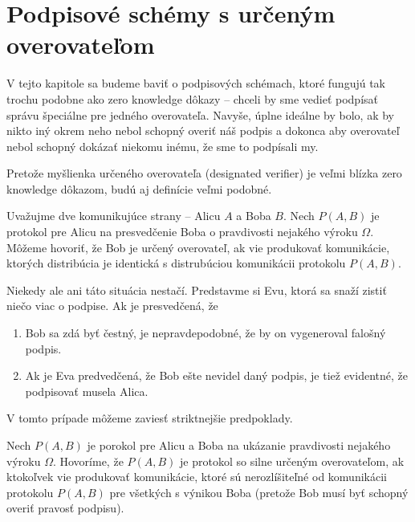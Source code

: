 \section{Podpisové schémy s určeným overovateľom}

V tejto kapitole sa budeme baviť o podpisových schémach, ktoré fungujú
tak trochu podobne ako zero knowledge dôkazy -- chceli by sme vedieť
podpísať správu špeciálne pre jedného overovateľa. Navyše, úplne
ideálne by bolo, ak by nikto iný okrem neho nebol schopný overiť náš
podpis a dokonca aby overovateľ nebol schopný dokázať niekomu inému,
že sme to podpísali my.

Pretože myšlienka určeného overovateľa (designated verifier) je veľmi
blízka zero knowledge dôkazom, budú aj definície veľmi podobné.

\begin{definicia}
    Uvažujme dve komunikujúce strany -- Alicu $A$ a Boba $B$. Nech
    $P(A,B)$ je protokol pre Alicu na presvedčenie
    Boba o pravdivosti nejakého výroku $\Omega$. Môžeme hovoriť, že
    Bob je určený overovateľ, ak vie produkovať komunikácie, ktorých
    distribúcia je identická s distrubúciou komunikácii protokolu
    $P(A,B)$.
\end{definicia}

Niekedy ale ani táto situácia nestačí. Predstavme si Evu, ktorá sa
snaží zistiť niečo viac o podpise. Ak je presvedčená, že
\begin{enumerate}
    \item Bob sa zdá byť čestný, je nepravdepodobné, že by on
    vygeneroval falošný podpis.

    \item Ak je Eva predvedčená, že Bob ešte nevidel daný podpis, je
    tiež evidentné, že podpisovať musela Alica.
\end{enumerate}

V tomto prípade môžeme zaviesť striktnejšie predpoklady.

\begin{definicia}
    Nech $P(A,B)$ je porokol pre Alicu a Boba na ukázanie pravdivosti
    nejakého výroku $\Omega$. Hovoríme, že $P(A,B)$ je protokol so
    silne určeným overovateľom, ak ktokoľvek vie produkovať
    komunikácie, ktoré sú nerozlíšiteľné od komunikácii protokolu
    $P(A,B)$ pre všetkých s výnikou Boba (pretože Bob musí byť schopný
    overiť pravosť podpisu).
\end{definicia}


